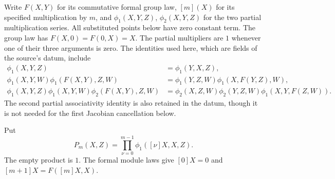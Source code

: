 Write \(F(X,Y)\) for its commutative formal group law,
\([m](X)\) for its specified multiplication by \(m\), and
\(\phi_1(X,Y,Z)\), \(\phi_2(X,Y,Z)\) for the two partial
multiplication series.
All substituted points below have zero constant term.
The group law has \(F(X,0)=F(0,X)=X\).
The partial multipliers are \(1\) whenever one of their
three arguments is zero.
The identities used here, which are fields of the
source's datum, include
\[
 \begin{split}
 \phi_1(X,Y,Z)&=\phi_1(Y,X,Z),\\
 \phi_1(X,Y,W)\phi_1(F(X,Y),Z,W)
   &=\phi_1(Y,Z,W)\phi_1(X,F(Y,Z),W),\\
 \phi_1(X,Y,Z)\phi_1(X,Y,W)\phi_2(F(X,Y),Z,W)
   &=\phi_2(X,Z,W)\phi_2(Y,Z,W)
                                  \phi_1(X,Y,F(Z,W)).
 \end{split}
 \tag{FP1}\label{eq:faithful-partial-laws}
\]
The second partial associativity identity is also retained
in the datum, though it is not needed for the first
Jacobian cancellation below.

Put
\[
                P_m(X,Z)=\prod_{\nu=0}^{m-1}
                                  \phi_1([\nu]X,X,Z).
 \tag{FP2}\label{eq:faithful-Pm}
\]
The empty product is \(1\).
The formal module laws give \([0]X=0\) and
\([m+1]X=F([m]X,X)\).

